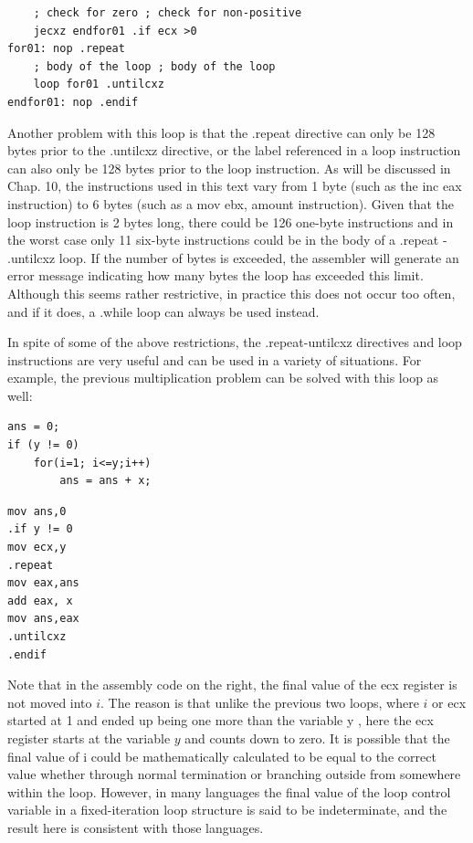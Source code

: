 \documentclass[10pt]{article}
\begin{document}
\begin{verbatim}
    ; check for zero ; check for non-positive
    jecxz endfor01 .if ecx >0
for01: nop .repeat
    ; body of the loop ; body of the loop
    loop for01 .untilcxz
endfor01: nop .endif
\end{verbatim}

Another problem with this loop is that the .repeat directive can only be 128 bytes prior to the .untilcxz directive, or the label referenced in a loop instruction can also only be 128 bytes prior to the loop instruction. As will be discussed in Chap. 10, the instructions used in this text vary from 1 byte (such as the inc eax instruction) to 6 bytes (such as a mov ebx, amount instruction). Given that the loop instruction is 2 bytes long, there could be 126 one-byte instructions and in the worst case only 11 six-byte instructions could be in the body of a .repeat - .untilcxz loop. If the number of bytes is exceeded, the assembler will generate an error message indicating how many bytes the loop has exceeded this limit. Although this seems rather restrictive, in practice this does not occur too often, and if it does, a .while loop can always be used instead.

In spite of some of the above restrictions, the .repeat-untilcxz directives and loop instructions are very useful and can be used in a variety of situations. For example, the previous multiplication problem can be solved with this loop as well:

\begin{verbatim}
ans = 0;
if (y != 0)
    for(i=1; i<=y;i++)
        ans = ans + x;
\end{verbatim}

\begin{verbatim}
mov ans,0
.if y != 0
mov ecx,y
.repeat
mov eax,ans
add eax, x
mov ans,eax
.untilcxz
.endif
\end{verbatim}

Note that in the assembly code on the right, the final value of the ecx register is not moved into $i$. The reason is that unlike the previous two loops, where $i$ or ecx started at 1 and ended up being one more than the variable y , here the ecx register starts at the variable $y$ and counts down to zero. It is possible that the final value of i could be mathematically calculated to be equal to the correct value whether through normal termination or branching outside from somewhere within the loop. However, in many languages the final value of the loop control variable in a fixed-iteration loop structure is said to be indeterminate, and the result here is consistent with those languages.
\end{document}
